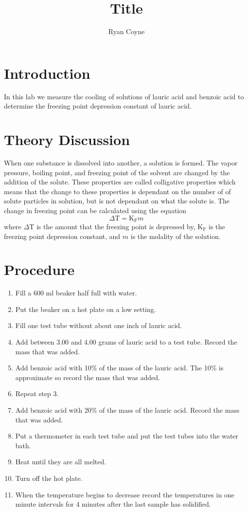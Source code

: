\documentclass[12pt]{article}\usepackage[]{graphicx}\usepackage[]{xcolor}
\begin{document}
    \title{Title}
    \author{Ryan Coyne}
    \maketitle
    \section*{Introduction}
        In this lab we measure the cooling of solutions of lauric acid and benzoic acid to determine the freezing point depression constant of lauric acid.
    \section*{Theory Discussion}
        When one substance is dissolved into another, a solution is formed. The vapor pressure, boiling point, and freezing point of the solvent are changed by the addition of the solute. These properties are called colligative properties which means that the change to these properties is dependant on the number of of solute particles in solution, but is not dependant on what the solute is. The change in freezing point can be calculated using the equation\
        \begin{equation*}
            \Delta \text{T} = \text{K}_\text{F}m
        \end{equation*}
        where \(\Delta\)T is the amount that the freezing point is depressed by, \(\text{K}_\text{F}\) is the freezing point depression constant, and \(m\) is the molality of the solution.
    \section*{Procedure}
        \begin{enumerate}
            \item Fill a 600 ml beaker half full with water.
            \item Put the beaker on a hot plate on a low setting.
            \item Fill one test tube without about one inch of lauric acid.
            \item Add between 3.00 and 4.00 grams of lauric acid to a test tube. Record the mass that was added.
            \item Add benzoic acid with 10\% of the mass of the lauric acid. The 10\% is approximate so record the mass that was added.
            \item Repeat step 3.
            \item Add benzoic acid with 20\% of the mass of the lauric acid. Record the mass that was added.
            \item Put a thermometer in each test tube and put the test tubes into the water bath.
            \item Heat until they are all melted.
            \item Turn off the hot plate.
            \item When the temperature begins to decrease record the temperatures in one minute intervals for 4 minutes after the last sample has solidified.
        \end{enumerate}
\end{document}

